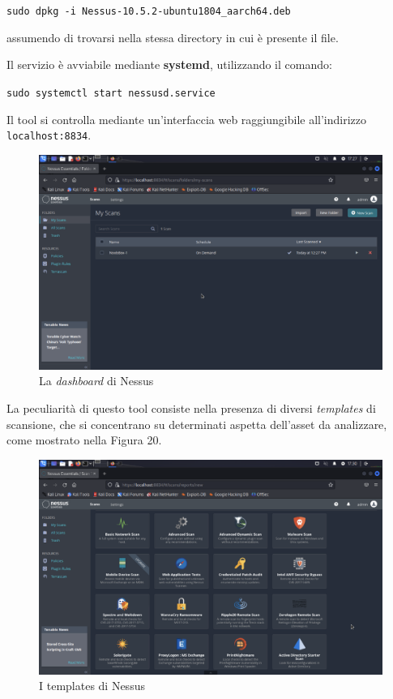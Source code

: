 \documentclass[a4paper, 12pt, oneside]{article}
\begin{document}
\begin{center}
    \texttt{sudo dpkg -i Nessus-10.5.2-ubuntu1804\_aarch64.deb}
\end{center}

assumendo di trovarsi nella stessa directory in cui è presente il file.

Il servizio è avviabile mediante \textbf{systemd}, utilizzando il comando:

\begin{center}
    \texttt{sudo systemctl start nessusd.service}
\end{center}

Il tool si controlla mediante un'interfaccia web raggiungibile all'indirizzo \texttt{localhost:8834}.

\begin{figure}[h!]
    \centering
    \includegraphics[width=\textwidth]{img/nessus-dashboard.png}
    \caption{La \textit{dashboard} di Nessus}
\end{figure}

La peculiarità di questo tool consiste nella presenza di diversi \textit{templates} di scansione, che si concentrano su determinati aspetta dell'asset da analizzare, come mostrato nella Figura 20.

\begin{figure}[h!]
    \centering
    \includegraphics[width=\textwidth]{img/nessus-templates.png}
    \caption{I templates di Nessus}
\end{figure}
\end{document}
